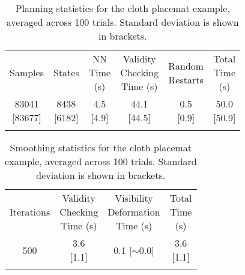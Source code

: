 \begin{table*}[ht]
\centering
\caption{Planning statistics for the cloth placemat example, averaged across 100 trials. Standard deviation is shown in brackets.}
\label{tab:live_robot_stats_planning}
\begin{tabular}{cccccc}
\noalign{\smallskip}\hline\noalign{\smallskip}
Samples & 
States &
\makecell{NN\\Time\\(s)} & 
\makecell{Validity\\Checking\\Time (s)} & 
\makecell{Random\\Restarts} &
\makecell{Total\\Time\\(s)} \\
\noalign{\smallskip}\hline\noalign{\smallskip}
\makecell{83041\\{[83677]}} &
\makecell{8438\\{[6182]}} &
\makecell{4.5\\{[4.9]}} &
\makecell{44.1\\{[44.5]}} &
\makecell{0.5\\{[0.9]}} &
\makecell{50.0\\{[50.9]}} \\
\noalign{\smallskip}\hline
\end{tabular}
\end{table*}




\begin{table}[ht]
\centering
\caption{Smoothing statistics for the cloth placemat example, averaged across 100 trials. Standard deviation is shown in brackets.}
\label{tab:live_robot_stats_smoothing}
\begin{tabular}{cccc}
\noalign{\smallskip}\hline\noalign{\smallskip}
Iterations & 
\makecell{Validity\\Checking\\Time (s)} &
\makecell{Visibility\\Deformation\\Time (s)} &
\makecell{Total\\Time\\(s)} \\
\noalign{\smallskip}\hline\noalign{\smallskip}
500 &
\makecell{3.6\\{[1.1]}} &
\makecell{0.1\\{[$\sim$0.0]}} &
\makecell{3.6\\{[1.1]}} \\
\noalign{\smallskip}\hline
\end{tabular}
\end{table}


